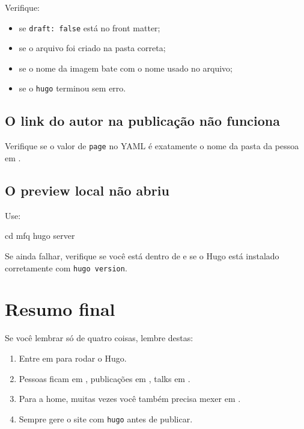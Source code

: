 \documentclass[11pt,a4paper]{article}
\begin{document}
Verifique:

\begin{itemize}
  \item se \texttt{draft: false} está no front matter;
  \item se o arquivo foi criado na pasta correta;
  \item se o nome da imagem bate com o nome usado no arquivo;
  \item se o \texttt{hugo} terminou sem erro.
\end{itemize}

\subsection{O link do autor na publicação não funciona}

Verifique se o valor de \texttt{page} no YAML é exatamente o nome da pasta da pessoa em
.

\subsection{O preview local não abriu}

Use:

\begin{terminal}
cd mfq
hugo server
\end{terminal}

Se ainda falhar, verifique se você está dentro de  e se o Hugo está instalado corretamente com
\texttt{hugo version}.

\section{Resumo final}

Se você lembrar só de quatro coisas, lembre destas:

\begin{enumerate}
  \item Entre em  para rodar o Hugo.
  \item Pessoas ficam em , publicações em , talks em .
  \item Para a home, muitas vezes você também precisa mexer em .
  \item Sempre gere o site com \texttt{hugo} antes de publicar.
\end{enumerate}
\end{document}
